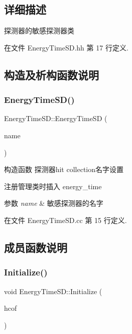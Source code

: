 \subsection{详细描述}
探测器的敏感探测器类 

在文件 Energy\+Time\+S\+D.\+hh 第 17 行定义.



\subsection{构造及析构函数说明}
\mbox{\label{classEnergyTimeSD_a501274766adbbe35de4e8f307ed5b411}} 
\subsubsection{\texorpdfstring{Energy\+Time\+S\+D()}{EnergyTimeSD()}}
{\footnotesize\ttfamily Energy\+Time\+S\+D\+::\+Energy\+Time\+SD (\begin{DoxyParamCaption}\item[{G4\+String}]{name }\end{DoxyParamCaption})}



构造函数 探测器hit collection名字设置 

注册管理类时插入 energy\+\_\+time


\begin{DoxyParams}{参数}
{\em name} & 敏感探测器的名字 \\
\hline
\end{DoxyParams}


在文件 Energy\+Time\+S\+D.\+cc 第 15 行定义.



\subsection{成员函数说明}
\mbox{\label{classEnergyTimeSD_a81809ac7ecdc9eb7bcdc00d489cb9fb3}} 
\subsubsection{\texorpdfstring{Initialize()}{Initialize()}}
{\footnotesize\ttfamily void Energy\+Time\+S\+D\+::\+Initialize (\begin{DoxyParamCaption}\item[{G4\+H\+Cof\+This\+Event $\ast$}]{hcof }\end{DoxyParamCaption})\hspace{0.3cm}{\ttfamily [override]}}



